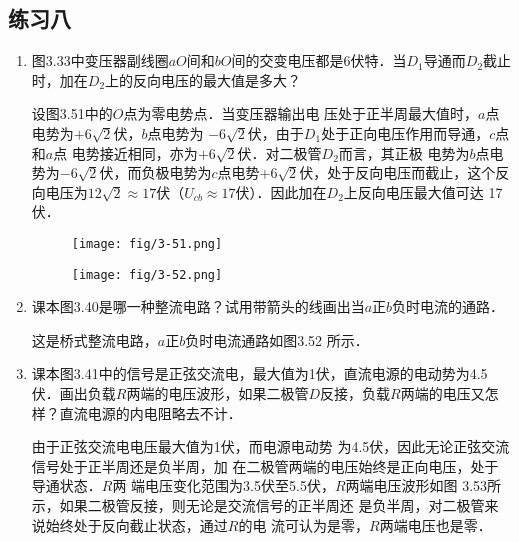 \subsection{练习八}
\begin{enumerate}
	\item 图3.33中变压器副线圈$aO$间和$bO$间的交变电压都是6伏特．当$D_1$导通而$D_2$截止时，加在$D_2$上的反向电压的最大值是多大？

    \begin{solution}
设图3.51中的$O$点为零电势点．当变压器输出电
压处于正半周最大值时，$a$点电势为$+6\sqrt{2}$伏，$b$点电势为
$-6\sqrt{2}$伏，由于$D_1$处于正向电压作用而导通，$c$点和$a$点
电势接近相同，亦为$+6\sqrt{2}$伏．对二极管$D_2$而言，其正极
电势为$b$点电势为$-6\sqrt{2}$伏，而负极电势为$c$点电势$+6\sqrt{2}$伏，处于反向电压而截止，这个反向电压为$12\sqrt{2}\approx 17$伏（$U_{cb}\approx 17$伏）．因此加在$D_2$上反向电压最大值可达
17伏．
    \end{solution}

\begin{figure}[htp]\centering
    \begin{minipage}[t]{0.48\textwidth}
    \centering
\texttt{[image: fig/3-51.png]}
    \caption{}
    \end{minipage}
    \begin{minipage}[t]{0.48\textwidth}
    \centering
\texttt{[image: fig/3-52.png]}
    \caption{}
    \end{minipage}
    \end{figure}

	\item 课本图3.40是哪一种整流电路？试用带箭头的线画出当$a$正$b$负时电流的通路．

    \begin{solution}
        这是桥式整流电路，$a$正$b$负时电流通路如图3.52
        所示．
    \end{solution}
    
	\item 课本图3.41中的信号是正弦交流电，最大值为1伏，直流电源的电动势为4.5伏．画出负载$R$两端的电压波形，如果二极管$D$反接，负载$R$两端的电压又怎样？直流电源的内电阻略去不计．

\begin{solution}
    由于正弦交流电电压最大值为1伏，而电源电动势
为4.5伏，因此无论正弦交流信号处于正半周还是负半周，加
在二极管两端的电压始终是正向电压，处于导通状态．$R$两
端电压变化范围为3.5伏至5.5伏，$R$两端电压波形如图
3.53所示，如果二极管反接，则无论是交流信号的正半周还
是负半周，对二极管来说始终处于反向截止状态，通过$R$的电
流可认为是零，$R$两端电压也是零．
\begin{figure}[htp]
    \centering
{}
\end{figure}
\end{solution}
\end{enumerate}
